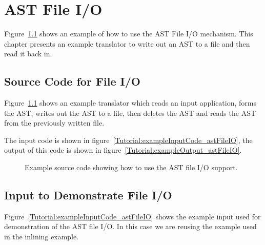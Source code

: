 \chapter{AST File I/O}

   Figure~\ref{Tutorial:example_astFileIO} shows an
example of how to use the AST File I/O mechanism.  This chapter 
presents an example translator to write out an AST to a file and 
then read it back in.


\section{Source Code for File I/O}

    Figure~\ref{Tutorial:example_astFileIO}
shows an example translator which reads an input application, forms the
AST, writes out the AST to a file, then deletes the AST and reads the
AST from the previously written file. 

The input code is shown in figure~\ref{Tutorial:exampleInputCode_astFileIO},
the output of this code is shown in 
figure~\ref{Tutorial:exampleOutput_astFileIO}.

\begin{figure}[!h]
{\indent
{\mySmallFontSize

\begin{latexonly}
   
\end{latexonly}

\begin{htmlonly}
   
\end{htmlonly}

}
}
\caption{Example source code showing how to use the AST file I/O support.}
\label{Tutorial:example_astFileIO}
\end{figure}



\section{Input to Demonstrate File I/O}

   Figure~\ref{Tutorial:exampleInputCode_astFileIO}
shows the example input used for demonstration of the AST file I/O.
In this case we are reusing the example used in the inlining example.


